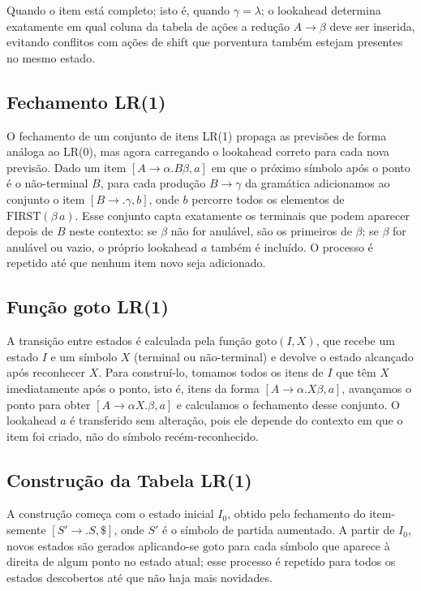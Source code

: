 Quando o item está completo; isto é, quando \(\gamma =
\lambda\); o lookahead determina exatamente em qual coluna da
tabela de ações a redução \(A \to \beta\) deve ser inserida, evitando
conflitos com ações de shift que porventura também estejam presentes
no mesmo estado.

\subsection{Fechamento LR(1)}

O fechamento de um conjunto de itens LR(1) propaga as previsões de
forma análoga ao LR(0), mas agora carregando o lookahead correto para
cada nova previsão. Dado um item \([A \to \alpha . B \beta, a]\) em
que o próximo símbolo após o ponto é o não-terminal \(B\), para cada
produção \(B \to \gamma\) da gramática adicionamos ao conjunto o item
\([B \to . \gamma, b]\), onde \(b\) percorre todos os elementos de
\(\text{FIRST}(\beta\, a)\). Esse conjunto capta exatamente os
terminais que podem aparecer depois de \(B\) neste contexto: se
\(\beta\) não for anulável, são os primeiros de \(\beta\); se
\(\beta\) for anulável ou vazio, o próprio lookahead \(a\) também é
incluído. O processo é repetido até que nenhum item novo seja adicionado.

\subsection{Função goto LR(1)}

A transição entre estados é calculada pela função \(\text{goto}(I,
X)\), que recebe um estado \(I\) e um símbolo \(X\) (terminal ou
não-terminal) e devolve o estado alcançado após reconhecer \(X\).
Para construí-lo, tomamos todos os itens de \(I\) que têm \(X\)
imediatamente após o ponto, isto é, itens da forma \([A \to \alpha . X
\beta, a]\), avançamos o ponto para obter \([A \to \alpha X .
\beta, a]\) e calculamos o fechamento desse conjunto. O lookahead
\(a\) é transferido sem alteração, pois ele depende do contexto em
que o item foi criado, não do símbolo recém-reconhecido.

\subsection{Construção da Tabela LR(1)}

A construção começa com o estado inicial \(I_0\), obtido pelo
fechamento do item-semente \([S' \to . S, \$]\), onde \(S'\) é o
símbolo de partida aumentado. A partir de \(I_0\), novos estados são
gerados aplicando-se \(\text{goto}\) para cada símbolo que aparece à
direita de algum ponto no estado atual; esse processo é repetido para
todos os estados descobertos até que não haja mais novidades.

